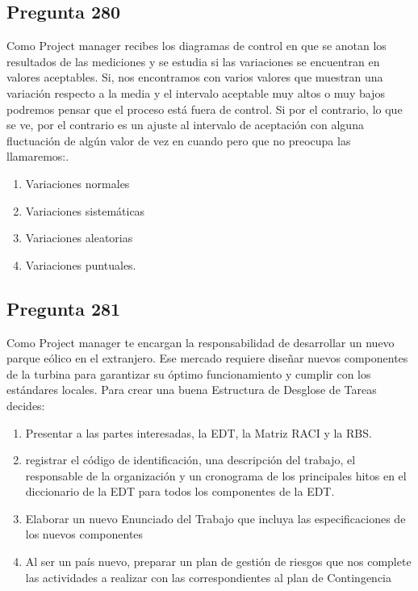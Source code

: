 \documentclass[11pt,a4paper]{article}
\begin{document}
\subsection*{Pregunta 280}
Como Project manager recibes los diagramas de control en que se anotan los resultados de las mediciones y se estudia si las variaciones se encuentran en valores aceptables. Si, nos encontramos con varios valores que muestran una variación respecto a la media y el intervalo aceptable muy altos o muy bajos podremos pensar que el proceso está fuera de control. Si por el contrario, lo que se ve, por el contrario es un ajuste al intervalo de aceptación con alguna fluctuación de algún valor de vez en cuando pero que no preocupa las llamaremos:.

\begin{enumerate}[label=\alph*)]
  \item Variaciones normales
  \item Variaciones sistemáticas
  \item Variaciones aleatorias
  \item Variaciones puntuales.
\end{enumerate}

\subsection*{Pregunta 281}
Como Project manager te encargan la responsabilidad de desarrollar un nuevo parque eólico en el extranjero. Ese mercado requiere diseñar nuevos componentes de la turbina para garantizar su óptimo funcionamiento y cumplir con los estándares locales. Para crear una buena Estructura de Desglose de Tareas decides:

\begin{enumerate}[label=\alph*)]
  \item Presentar a las partes interesadas, la EDT, la Matriz RACI y la RBS.
  \item registrar el código de identificación, una descripción del trabajo, el responsable de la organización y un cronograma de los principales hitos en el diccionario de la EDT para todos los componentes de la EDT.
  \item Elaborar un nuevo Enunciado del Trabajo que incluya las especificaciones de los nuevos componentes
  \item Al ser un país nuevo, preparar un plan de gestión de riesgos que nos complete las actividades a realizar con las correspondientes al plan de Contingencia
\end{enumerate}
\end{document}
